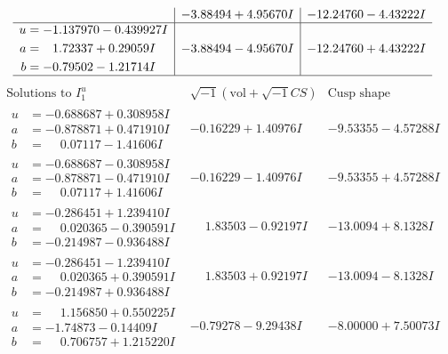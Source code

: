 \documentclass[1p]{elsarticle_modified}
\theoremstyle{definition}
\newcommand{\I}{\sqrt{-1}}
\begin{document}
$$\begin{array}{c|c|c}
 & -3.88494 + 4.95670 I & -12.24760 - 4.43222 I \\ \hline\begin{aligned}
u &= -1.137970 - 0.439927 I \\
a &= \phantom{-}1.72337 + 0.29059 I \\
b &= -0.79502 - 1.21714 I\end{aligned}
 & -3.88494 - 4.95670 I & -12.24760 + 4.43222 I\\
 \hline 
 \end{array}$$\newpage$$\begin{array}{c|c|c}  
\text{Solutions to }I^u_{1}& \I (\text{vol} + \sqrt{-1}CS) & \text{Cusp shape}\\
 \hline 
\begin{aligned}
u &= -0.688687 + 0.308958 I \\
a &= -0.878871 + 0.471910 I \\
b &= \phantom{-}0.07117 - 1.41606 I\end{aligned}
 & -0.16229 + 1.40976 I & -9.53355 - 4.57288 I \\ \hline\begin{aligned}
u &= -0.688687 - 0.308958 I \\
a &= -0.878871 - 0.471910 I \\
b &= \phantom{-}0.07117 + 1.41606 I\end{aligned}
 & -0.16229 - 1.40976 I & -9.53355 + 4.57288 I \\ \hline\begin{aligned}
u &= -0.286451 + 1.239410 I \\
a &= \phantom{-}0.020365 - 0.390591 I \\
b &= -0.214987 - 0.936488 I\end{aligned}
 & \phantom{-}1.83503 - 0.92197 I & -13.0094 + 8.1328 I \\ \hline\begin{aligned}
u &= -0.286451 - 1.239410 I \\
a &= \phantom{-}0.020365 + 0.390591 I \\
b &= -0.214987 + 0.936488 I\end{aligned}
 & \phantom{-}1.83503 + 0.92197 I & -13.0094 - 8.1328 I \\ \hline\begin{aligned}
u &= \phantom{-}1.156850 + 0.550225 I \\
a &= -1.74873 - 0.14409 I \\
b &= \phantom{-}0.706757 + 1.215220 I\end{aligned}
 & -0.79278 - 9.29438 I & -8.00000 + 7.50073 I \\ \hline\begin{aligned}

\end{aligned}
\end{array}$$
\end{document}
